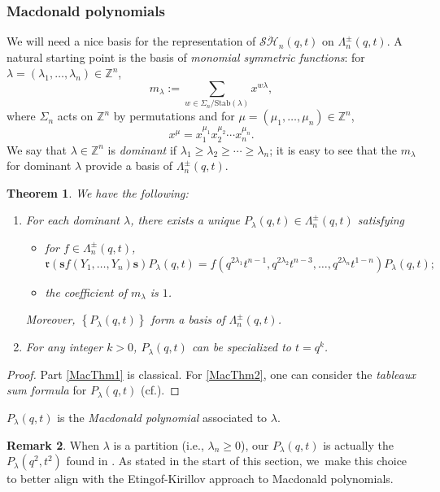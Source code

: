 \documentclass[11pt]{article}
\newcommand{\cf}{cf.\xspace}
\newtheorem{thm}{Theorem}[section]
\theoremstyle{definition}
\newtheorem{rem}[thm]{Remark}
\newcommand{\ZZ}{\mathbb{Z}}
\newcommand{\SHH}{\mathcal{S}\ddot{\mathcal{H}}}
\newcommand{\ee}{\boldsymbol{s}}
\newcommand{\rrr}{\mathfrak{r}}
\begin{document}
\subsubsection{Macdonald polynomials}
We will need a nice basis for the representation of $\SHH_n(q,t)$ on $\Lambda^\pm_n(q,t)$.
A natural starting point is the basis of \textit{monomial symmetric functions}: for $\lambda=(\lambda_1,\ldots, \lambda_n)\in\ZZ^n$,
\[
m_\lambda:=\sum_{w\in\Sigma_n/\mathrm{Stab}(\lambda)}x^{w\lambda},
\]
where $\Sigma_n$ acts on $\ZZ^n$ by permutations and for $\mu=(\mu_1,\ldots, \mu_n)\in\ZZ^n$,
\[
x^\mu=x_1^{\mu_1}x_2^{\mu_2}\cdots x_n^{\mu_n}.
\]
We say that $\lambda\in\ZZ^n$ is \textit{dominant} if $\lambda_1\ge\lambda_2\ge\cdots\ge\lambda_n$; it is easy to see that the $m_\lambda$ for dominant $\lambda$ provide a basis of $\Lambda_n^\pm(q,t)$.
\begin{thm}\label{MacThm}
We have the following:
\begin{enumerate}
\item\label{MacThm1} For each dominant $\lambda$, there exists a unique $P_\lambda(q,t)\in\Lambda_n^\pm(q,t)$ satisfying
\begin{itemize}
\item for $f\in\Lambda_n^\pm(q,t)$,
\[
\rrr\left(\ee f(Y_1,\ldots, Y_n)\ee \right)P_\lambda(q,t)=f\left(q^{2\lambda_1}t^{n-1},q^{2\lambda_2}t^{n-3},\ldots,q^{2\lambda_n}t^{1-n}\right)P_\lambda(q,t);
\]
\item the coefficient of $m_\lambda$ is $1$.
\end{itemize}
Moreover, $\left\{ P_\lambda(q,t) \right\}$ form a basis of $\Lambda_n^\pm(q,t)$.
\item\label{MacThm2} For any integer $k>0$, $P_\lambda(q,t)$ can be specialized to $t=q^k$.
\end{enumerate}
\end{thm}

\begin{proof}
Part \eqref{MacThm1} is classical.
For \eqref{MacThm2}, one can consider the \textit{tableaux sum formula} for $P_\lambda(q,t)$ (\cf \cite[VI.6]{MacBook}).
\end{proof}

$P_\lambda(q,t)$ is the \textit{Macdonald polynomial} associated to $\lambda$.

\begin{rem}
When $\lambda$ is a partition (i.e., $\lambda_n\ge 0$), our $P_\lambda(q,t)$ is actually the $P_\lambda(q^2,t^2)$ found in \cite{MacBook}.
As stated in the start of this section, we~make this choice to better align with the Etingof-Kirillov approach to Macdonald polynomials.
\end{rem}
\end{document}
